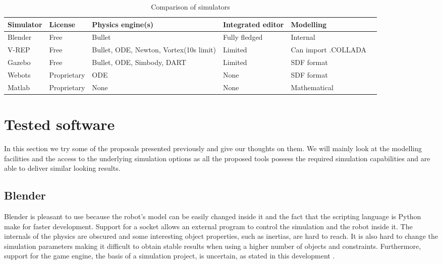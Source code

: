 \begin{table}[htp]
\center
\begin{tabularx}{\textwidth}{@{} l l X X X X @{}}
\toprule
\textbf{Simulator} & \textbf{License} & \textbf{Physics engine(s)} & \textbf{Integrated editor} & \textbf{Modelling}\\ 
\midrule
Blender & Free & Bullet & Fully fledged & Internal\\ 

V-REP & Free & Bullet, ODE, Newton, Vortex(10s limit) & Limited & Can import .COLLADA\\

Gazebo & Free & Bullet, ODE, Simbody, DART & Limited & SDF format\\

Webots & Proprietary & ODE & None & SDF format\\

Matlab & Proprietary & None & None & Mathematical\\
\bottomrule
\end{tabularx}
\caption{Comparison of simulators}
\label{table:simulators_comp}
\end{table}

\section{Tested software}
In this section we try some of the proposals presented previously and give our thoughts on them. We will mainly look at the modelling facilities and the access to the underlying simulation options as all the proposed tools possess the required simulation capabilities and are able to deliver similar looking results.

\subsection{Blender}
Blender is pleasant to use because the robot's model can be easily changed inside it and the fact that the scripting language is Python make for faster development. Support for a socket allows an external program to control the simulation and the robot inside it. The internals of the physics are obscured and some interesting object properties, such as inertias, are hard to reach. It is also hard to change the simulation parameters making it difficult to obtain stable results when using a higher number of objects and constraints. Furthermore, support for the game engine, the basis of a simulation project, is uncertain, as stated in this development \cite{blender_roadmap}.

